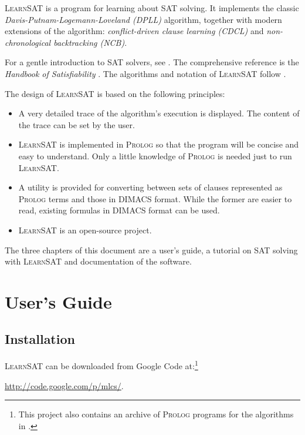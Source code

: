 \documentclass[11pt]{report}
\newcommand*{\ls}{\textsc{LearnSAT}}
\newcommand*{\pl}{\textsc{Prolog}}
\begin{document}
\ls{} is a program for learning about SAT solving. It implements the
classic \emph{Davis-Putnam-Logemann-Loveland (DPLL)} algorithm, together
with modern extensions of the algorithm: \emph{conflict-driven clause
learning (CDCL)} and \emph{non-chronological backtracking (NCB)}.

For a gentle introduction to SAT solvers, see \cite[Chapter~6]{mlcs}.
The comprehensive reference is the \emph{Handbook of Satisfiability}
\cite{SAT}. The algorithms and notation of \ls{} follow \cite{mlm}.

The design of \ls{} is based on the following principles:

\begin{itemize}

\item A very detailed trace of the algorithm's execution is
displayed. The content of the trace can be set by the user.

\item \ls{} is implemented in \pl{} so that the program will be concise
and easy to understand. Only a little knowledge of \pl{} is needed
just to run \ls{}.

\item A utility is provided for converting between sets of clauses
represented as \pl{} terms and those in DIMACS format. While the former
are easier to read, existing formulas in DIMACS format can be used.

\item \ls{} is an open-source project.
\end{itemize}

The three chapters of this document are a user's guide, a tutorial on
SAT solving with \ls{} and documentation of the software.


\chapter{User's Guide}

\section{Installation}

\ls{} can be downloaded from Google Code at:\footnote{This project also
contains an archive of \pl{} programs for the algorithms in \cite{mlcs}.}
\begin{center}
\url{http://code.google.com/p/mlcs/}.
\end{center}
\end{document}
